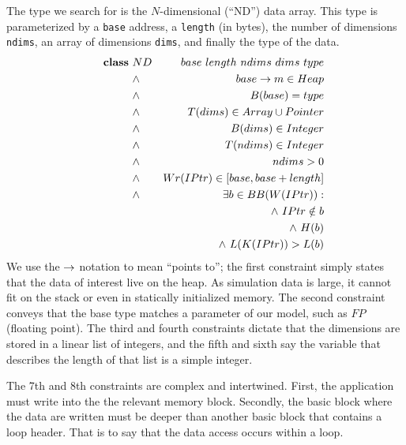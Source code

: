

The type we search for is the $N$-dimensional (``ND'') data array.
This type is parameterized by a \texttt{base} address, a
\texttt{length} (in bytes), the number of
dimensions \texttt{ndims}, an array of dimensions \texttt{dims}, and
finally the type of the data.
\begin{eqnarray}
  \indent \textbf{class} \ & ND & \  base \  length \  ndims \  dims \  type
    \nonumber\\
  \indent &\land& base \pointsto m \in Heap\\
  \indent &\land& B(base) = type\\
  \indent &\land& T(dims) \in Array \union Pointer\\
  \indent &\land& B(dims) \in Integer\\
  \indent &\land& T(ndims) \in Integer\\
  \indent &\land& ndims > 0\\
  \indent &\land& Wr(IPtr) \in [ base, base + length ]\\
  \indent &\land& \exists b \in BB(W(IPtr)) : \nonumber\\
    && \land \ IPtr \notin b \nonumber \\
    && \land \ H(b) \nonumber\\
    && \land \ L(K(IPtr)) > L(b)
\end{eqnarray}
We use the $\rightarrow$ notation to mean ``points to''; the first
constraint simply states that the data of interest live on the heap.
As simulation data is large, it cannot fit on the stack or even in
statically initialized memory.  The second constraint conveys that the base
type matches a parameter of our model, such as $FP$ (floating point).
The third and fourth constraints dictate that the dimensions are stored
in a linear list of integers, and the fifth and sixth say the variable
that describes the length of that list is a simple integer.

The 7th and 8th constraints are complex and intertwined.  First, the
application must write into the the relevant memory block.  Secondly,
the basic block where the data are written must be deeper than another
basic block that contains a loop header.  That is to say that the data
access occurs within a loop.

